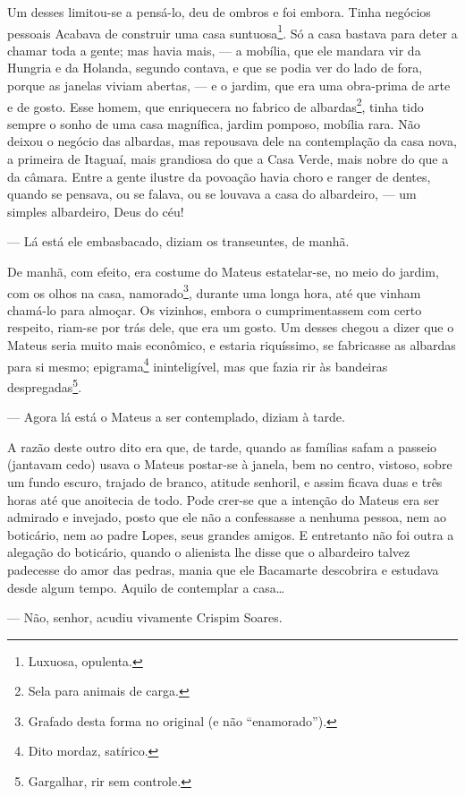 Um desses limitou-se a pensá-lo, deu de ombros e foi embora. Tinha
negócios pessoais Acabava de construir uma casa suntuosa\footnote{Luxuosa,
  opulenta.}. Só a casa bastava para deter a chamar toda a gente; mas
havia mais, --- a mobília, que ele mandara vir da Hungria e da Holanda,
segundo contava, e que se podia ver do lado de fora, porque as janelas
viviam abertas, --- e o jardim, que era uma obra-prima de arte e de
gosto. Esse homem, que enriquecera no fabrico de albardas\footnote{Sela
  para animais de carga.}, tinha tido sempre o sonho de uma casa
magnífica, jardim pomposo, mobília rara. Não deixou o negócio das
albardas, mas repousava dele na contemplação da casa nova, a primeira de
Itaguaí, mais grandiosa do que a Casa Verde, mais nobre do que a da
câmara. Entre a gente ilustre da povoação havia choro e ranger de
dentes, quando se pensava, ou se falava, ou se louvava a casa do
albardeiro, --- um simples albardeiro, Deus do céu!

--- Lá está ele embasbacado, diziam os transeuntes, de manhã.

De manhã, com efeito, era costume do Mateus estatelar-se, no meio do
jardim, com os olhos na casa, namorado\footnote{Grafado desta forma no
  original (e não ``enamorado'').}, durante uma longa hora, até que
vinham chamá-lo para almoçar. Os vizinhos, embora o cumprimentassem com
certo respeito, riam-se por trás dele, que era um gosto. Um desses
chegou a dizer que o Mateus seria muito mais econômico, e estaria
riquíssimo, se fabricasse as albardas para si mesmo; epigrama\footnote{Dito
  mordaz, satírico.} ininteligível, mas que fazia rir às bandeiras
despregadas\footnote{Gargalhar, rir sem controle.}.

--- Agora lá está o Mateus a ser contemplado, diziam à tarde.

A razão deste outro dito era que, de tarde, quando as famílias safam a
passeio (jantavam cedo) usava o Mateus postar-se à janela, bem no
centro, vistoso, sobre um fundo escuro, trajado de branco, atitude
senhoril, e assim ficava duas e três horas até que anoitecia de todo.
Pode crer-se que a intenção do Mateus era ser admirado e invejado, posto
que ele não a confessasse a nenhuma pessoa, nem ao boticário, nem ao
padre Lopes, seus grandes amigos. E entretanto não foi outra a alegação
do boticário, quando o alienista lhe disse que o albardeiro talvez
padecesse do amor das pedras, mania que ele Bacamarte descobrira e
estudava desde algum tempo. Aquilo de contemplar a casa\ldots{}

--- Não, senhor, acudiu vivamente Crispim Soares.

